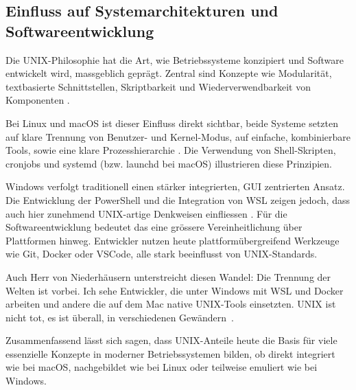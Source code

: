 \newpage
\subsection{Einfluss auf Systemarchitekturen und Softwareentwicklung}

Die UNIX-Philosophie hat die Art, wie Betriebssysteme konzipiert und Software entwickelt wird, massgeblich geprägt. Zentral sind Konzepte wie Modularität,
textbasierte Schnittstellen, Skriptbarkeit und Wiederverwendbarkeit von Komponenten \cite{ArtOfUnixProgramming}.

Bei Linux und macOS ist dieser Einfluss direkt sichtbar, beide Systeme setzten auf klare Trennung von Benutzer- und Kernel-Modus, auf einfache, kombinierbare Tools,
sowie eine klare Prozesshierarchie \cite{ModernOS, FreeBSDOS}. Die Verwendung von Shell-Skripten, cronjobs und systemd (bzw. launchd bei macOS) illustrieren diese
Prinzipien.

Windows verfolgt traditionell einen stärker integrierten, GUI zentrierten Ansatz. Die Entwicklung der PowerShell und die Integration von WSL zeigen jedoch, dass
auch hier zunehmend UNIX-artige Denkweisen einfliessen \cite{WSL, OSConcept}. Für die Softwareentwicklung bedeutet das eine grössere Vereinheitlichung über
Plattformen hinweg. Entwickler nutzen heute plattformübergreifend Werkzeuge wie Git, Docker oder VSCode, alle stark beeinflusst von UNIX-Standards.

Auch Herr von Niederhäusern unterstreicht diesen Wandel: \glqq Die Trennung der Welten ist vorbei. Ich sehe Entwickler, die unter Windows mit WSL und Docker
arbeiten und andere die auf dem Mac native UNIX-Tools einsetzten. UNIX ist nicht tot, es ist überall, in verschiedenen Gewändern\grqq \ \cite{interviewNH}.

Zusammenfassend lässt sich sagen, dass UNIX-Anteile heute die Basis für viele essenzielle Konzepte in moderner Betriebssystemen bilden, ob direkt integriert wie bei
macOS, nachgebildet wie bei Linux oder teilweise emuliert wie bei Windows.